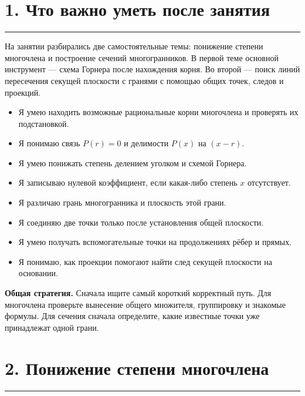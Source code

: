 \documentclass[a4paper,12pt]{article}
\newcommand{\sectionline}{%
  \vspace{-0.35em}\par\noindent
  \textcolor{accent!55}{\rule{\linewidth}{0.45pt}}\vspace{0.35em}
}
\newcommand{\keyidea}[2]{%
  \par\smallskip
  \noindent\textcolor{darkaccent}{\textbf{#1}} #2
  \par\smallskip
}
\newcommand{\checkitem}{\item[$\square$]}
\begin{document}

\section*{1. Что важно уметь после занятия}
\sectionline

На занятии разбирались две самостоятельные темы:
понижение степени многочлена и построение сечений многогранников.
В первой теме основной инструмент --- схема Горнера после нахождения корня.
Во второй --- поиск линий пересечения секущей плоскости с гранями
с помощью общих точек, следов и проекций.

\begin{itemize}
  \checkitem
  Я умею находить возможные рациональные корни многочлена
  и проверять их подстановкой.

  \checkitem
  Я понимаю связь $P(r)=0$ и делимости $P(x)$ на $(x-r)$.

  \checkitem
  Я умею понижать степень делением уголком и схемой Горнера.

  \checkitem
  Я записываю нулевой коэффициент,
  если какая-либо степень $x$ отсутствует.

  \checkitem
  Я различаю грань многогранника и плоскость этой грани.

  \checkitem
  Я соединяю две точки только после установления общей плоскости.

  \checkitem
  Я умею получать вспомогательные точки
  на продолжениях рёбер и прямых.

  \checkitem
  Я понимаю,
  как проекции помогают найти след секущей плоскости на основании.
\end{itemize}

\keyidea{Общая стратегия.}{
Сначала ищите самый короткий корректный путь.
Для многочлена проверьте вынесение общего множителя,
группировку и знакомые формулы.
Для сечения сначала определите,
какие известные точки уже принадлежат одной грани.
}


\section*{2. Понижение степени многочлена}
\sectionline
\end{document}
